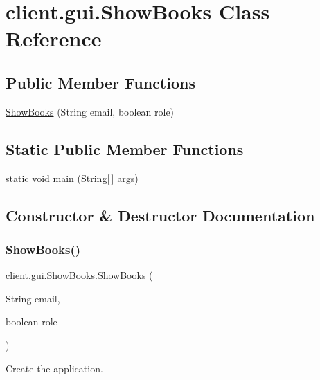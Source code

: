 \hypertarget{classclient_1_1gui_1_1_show_books}{}\section{client.\+gui.\+Show\+Books Class Reference}
\label{classclient_1_1gui_1_1_show_books}
\subsection*{Public Member Functions}
\begin{DoxyCompactItemize}
\item 
\hyperlink{classclient_1_1gui_1_1_show_books_a1e2d7c123fe2c11348f7136a592d7944}{Show\+Books} (String email, boolean role)
\end{DoxyCompactItemize}
\subsection*{Static Public Member Functions}
\begin{DoxyCompactItemize}
\item 
static void \hyperlink{classclient_1_1gui_1_1_show_books_acb7c683c6a19a35f85878d376c8b210e}{main} (String\mbox{[}$\,$\mbox{]} args)
\end{DoxyCompactItemize}


\subsection{Constructor \& Destructor Documentation}
\mbox{\label{classclient_1_1gui_1_1_show_books_a1e2d7c123fe2c11348f7136a592d7944}} 
\subsubsection{\texorpdfstring{Show\+Books()}{ShowBooks()}}
{\footnotesize\ttfamily client.\+gui.\+Show\+Books.\+Show\+Books (\begin{DoxyParamCaption}\item[{String}]{email,  }\item[{boolean}]{role }\end{DoxyParamCaption})}

Create the application. 

